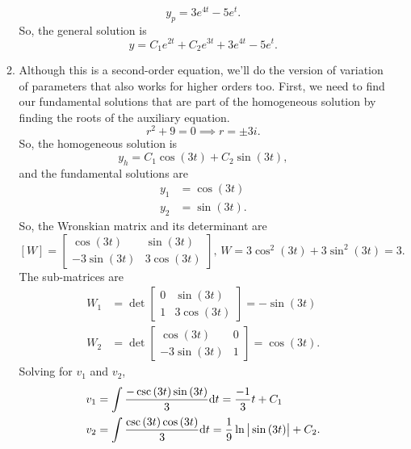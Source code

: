 \begin{enumerate}[label=\arabic*.]
\begin{enumerate}[label=(\alph*)]
\begin{equation*}
					y_p = 3e^{4t} - 5e^{t}.
				\end{equation*}
				So, the general solution is
				\begin{equation*}
					y = C_1e^{2t} + C_2e^{3t} + 3e^{4t} - 5e^{t}.
				\end{equation*}
			\item
				Although this is a second-order equation, we'll do the version of variation of parameters that also works for higher orders too.
				First, we need to find our fundamental solutions that are part of the homogeneous solution by finding the roots of the auxiliary equation.
				\begin{equation*}
					r^2 + 9 = 0 \implies r = \pm 3i.
				\end{equation*}
				So, the homogeneous solution is
				\begin{equation*}
					y_h = C_1\cos{(3t)} + C_2\sin{(3t)},
				\end{equation*}
				and the fundamental solutions are
				\begin{align*}
					y_1 &= \cos{(3t)} \\
					y_2 &= \sin{(3t)}.
				\end{align*}
				So, the Wronskian matrix and its determinant are
				\begin{equation*}
					\left[W\right] = \begin{bmatrix}
						\cos{(3t)} & \sin{(3t)} \\
						-3\sin{(3t)} & 3\cos{(3t)}
					\end{bmatrix} \text{, } W = 3\cos^2{(3t)} + 3\sin^2{(3t)} = 3.
				\end{equation*}
				The sub-matrices are
				\begin{align*}
					W_1 &= \det\begin{bmatrix}
						0 & \sin{(3t)} \\
						1 & 3\cos{(3t)}
					\end{bmatrix} = -\sin{(3t)} \\
					 W_2 &= \det\begin{bmatrix}
						\cos{(3t)} & 0 \\
						-3\sin{(3t)} & 1
					\end{bmatrix} = \cos{(3t)}.
				\end{align*}
				Solving for $v_1$ and $v_2$,
				\begin{align*}
					v_1 &= \int{\frac{-\csc{(3t)}\sin{(3t)}}{3} \mathrm{d}t} = \frac{-1}{3}t + C_1 \\
					v_2 &= \int{\frac{\csc{(3t)}\cos{(3t)}}{3} \mathrm{d}t} = \frac{1}{9}\ln{\abs{\sin{(3t)}}} + C_2.

\end{align*}
\end{enumerate}
\end{enumerate}
